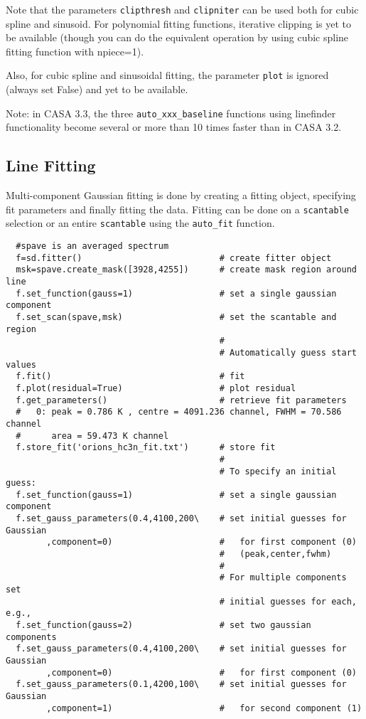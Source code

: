 Note that the parameters {\tt clipthresh} and {\tt clipniter} can be used 
both for cubic spline and sinusoid. For polynomial fitting functions, 
iterative clipping is yet to be available (though you can do the equivalent 
operation by using cubic spline fitting function with npiece=1). 

Also, for cubic spline and sinusoidal fitting, the parameter {\tt plot} is 
ignored (always set False) and yet to be available. 

Note: in CASA 3.3, the three {\tt auto\_xxx\_baseline} functions using 
linefinder functionality become several or more than 10 times faster than 
in CASA 3.2. 


\subsection{Line Fitting}
\label{subsection:sd.asap.LINEfitting}

Multi-component Gaussian fitting is done by
creating a fitting object, specifying fit parameters and finally
fitting the data. Fitting can be done on a {\tt scantable} selection
or an entire {\tt scantable} using the {\tt auto\_fit} function.

\small
\begin{verbatim}
  #spave is an averaged spectrum
  f=sd.fitter()                           # create fitter object
  msk=spave.create_mask([3928,4255])      # create mask region around line
  f.set_function(gauss=1)                 # set a single gaussian component
  f.set_scan(spave,msk)                   # set the scantable and region
                                          # 
                                          # Automatically guess start values
  f.fit()                                 # fit 
  f.plot(residual=True)                   # plot residual
  f.get_parameters()                      # retrieve fit parameters
  #   0: peak = 0.786 K , centre = 4091.236 channel, FWHM = 70.586 channel
  #      area = 59.473 K channel
  f.store_fit('orions_hc3n_fit.txt')      # store fit
                                          #
                                          # To specify an initial guess:
  f.set_function(gauss=1)                 # set a single gaussian component
  f.set_gauss_parameters(0.4,4100,200\    # set initial guesses for Gaussian
        ,component=0)                     #   for first component (0)
                                          #   (peak,center,fwhm)
                                          #
                                          # For multiple components set
                                          # initial guesses for each, e.g.,
  f.set_function(gauss=2)                 # set two gaussian components
  f.set_gauss_parameters(0.4,4100,200\    # set initial guesses for Gaussian
        ,component=0)                     #   for first component (0)
  f.set_gauss_parameters(0.1,4200,100\    # set initial guesses for Gaussian
        ,component=1)                     #   for second component (1)

\end{verbatim}
\normalsize


